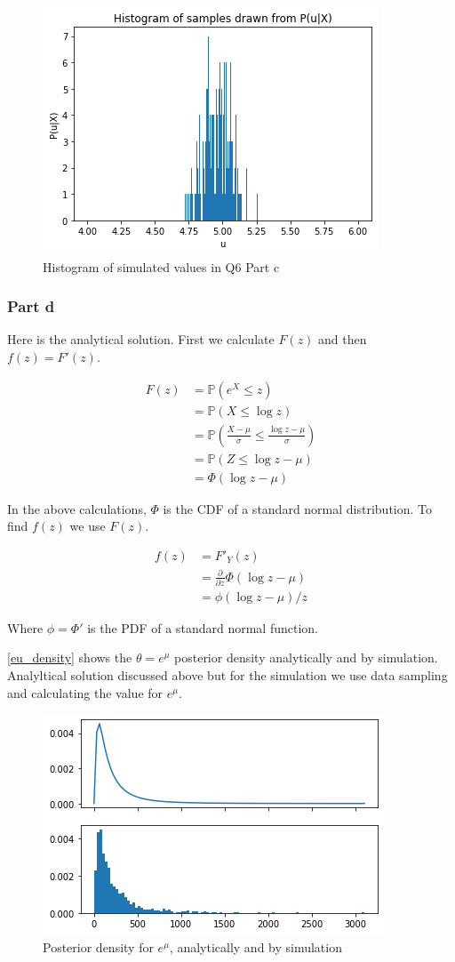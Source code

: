 \documentclass[12pt, a4paper]{book}
\begin{document}
\begin{figure}[h]
    \centering
    \includegraphics[width=0.5\linewidth]{image/q6/partc.png}
    \caption{Histogram of simulated values in Q6 Part c}
    \label{q6_simulation}
\end{figure}

\subsubsection*{Part d}

Here is the analytical solution. First we calculate $F(z)$ and then $f(z) = F'(z)$.

\begin{align*}
    F(z) & =  \mathbb{P} (e^X \leq z) \\
    & = \mathbb{P} (X \leq \log z) \\
    & = \mathbb{P} \left( \frac{X - \mu}{\sigma} \leq \frac{\log z - \mu}{\sigma} \right) \\
    & = \mathbb{P} (Z \leq \log z - \mu) \\
    & = \Phi(\log z - \mu)
\end{align*}

In the above calculations, $\Phi$ is the CDF of a standard normal distribution. To find $f(z)$ we use
$F(z)$.

\begin{align*}
    f(z) & = F'_Y(z) \\
    & = \frac{\partial}{\partial z} \Phi(\log z - \mu) \\
    & = \phi(\log z - \mu) / z
\end{align*}

Where $\phi = \Phi'$ is the PDF of a standard normal function.

\autoref{eu_density} shows the $\theta=e^\mu$ posterior density analytically and by simulation. Analyltical solution
discussed above but for the simulation we use data sampling and calculating the value for $e^\mu$.

\begin{figure}[h]
    \centering
    \includegraphics[width=0.5\linewidth]{image/q6/eu.png}
    \caption{Posterior density for $e^\mu$, analytically and by simulation}
    \label{eu_density}
\end{figure}
\end{document}
